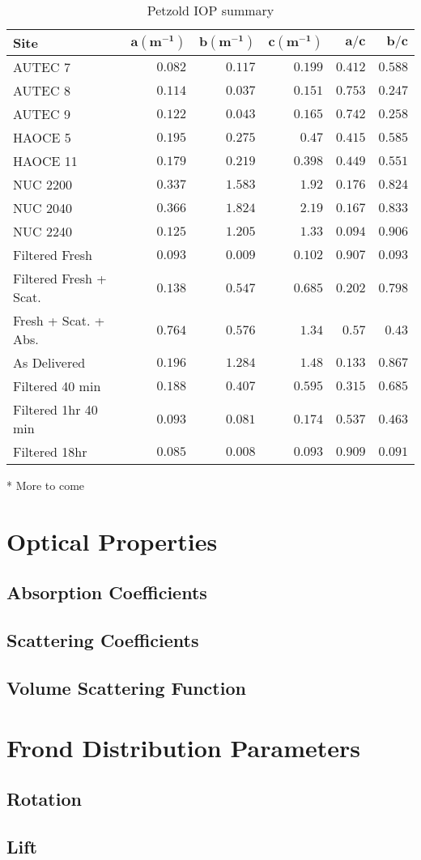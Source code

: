\begin{table}
  \centering
  \begin{tabular}{lrrrrr}
    \toprule
    \textbf{Site} & $\bm{a (\mbox{m}^{-1})}$ & $\bm{b (\mbox{m}^{-1})}$ & $\bm{c(\mbox{m}^{-1} )}$ & $\bm{a/c}$ & $\bm{b/c}$ \\
    \midrule
    AUTEC 7 & $0.082$ & $0.117$ & $0.199$ & $0.412$ & $0.588$ \\
    AUTEC 8 & $0.114$ & $0.037$ & $0.151$ & $0.753$ & $0.247$ \\
    AUTEC 9 & $0.122$ & $0.043$ & $0.165$ & $0.742$ & $0.258$ \\
    HAOCE 5 & $0.195$ & $0.275$ & $0.47$ & $0.415$ & $0.585$ \\
    HAOCE 11 & $0.179$ & $0.219$ & $0.398$ & $0.449$ & $0.551$ \\
    NUC 2200 & $0.337$ & $1.583$ & $1.92$ & $0.176$ & $0.824$ \\
    NUC 2040 & $0.366$ & $1.824$ & $2.19$ & $0.167$ & $0.833$ \\
    NUC 2240 & $0.125$ & $1.205$ & $1.33$ & $0.094$ & $0.906$ \\
    Filtered Fresh & $0.093$ & $0.009$ & $0.102$ & $0.907$ & $0.093$ \\
    Filtered Fresh + Scat.  & $0.138$ & $0.547$ & $0.685$ & $0.202$ & $0.798$ \\
    Fresh + Scat. + Abs.& $0.764$ & $0.576$ & $1.34$ & $0.57$ & $0.43$ \\
    As Delivered & $0.196$ & $1.284$ & $1.48$ & $0.133$ & $0.867$ \\
    Filtered 40 min & $0.188$ & $0.407$ & $0.595$ & $0.315$ & $0.685$ \\
    Filtered 1hr 40 min & $0.093$ & $0.081$ & $0.174$ & $0.537$ & $0.463$ \\
    Filtered 18hr & $0.085$ & $0.008$ & $0.093$ & $0.909$ & $0.091$ \\
    \bottomrule
    \end{tabular}
  \caption{Petzold IOP summary}
\end{table}

* More to come

\section{Optical Properties}
\subsection{Absorption Coefficients}
\subsection{Scattering Coefficients}
\subsection{Volume Scattering Function}

\section{Frond Distribution Parameters}
\subsection{Rotation}
\subsection{Lift}
